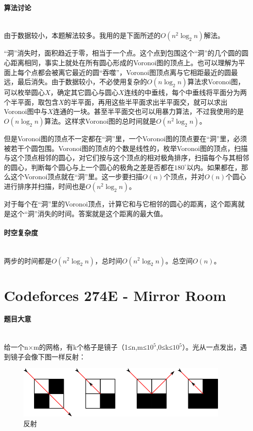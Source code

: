\documentclass[UTF8]{ctexart}
\newcommand{\myparagraph}[1]{\paragraph{#1}\mbox{}\\}
\theoremstyle{nonumberplain}
\begin{document}
		\myparagraph{算法讨论}
		
			由于数据较小，本题解法较多。我用的是下面所述的$O(n^2\log_2n)$解法。
		
			“洞”消失时，面积趋近于零，相当于一个点。这个点到包围这个“洞”的几个圆的圆心距离相同，事实上就处在所有圆心形成的Voronoi图的顶点上。也可以理解为平面上每个点都会被离它最近的圆“吞噬”，Voronoi图顶点离与它相距最近的圆最远，最后消失。由于数据较小，不必使用复杂的$O(n\log_2n)$算法求Voronoi图，可以枚举圆心$X$，确定其它圆心与圆心$X$连线的中垂线，每个中垂线将平面分为两个半平面，取包含$X$的半平面，再用这些半平面求出半平面交，就可以求出Voronoi图中与$X$连通的一块。甚至半平面交也可以用暴力算法，不过我使用的是$O(n\log_2n)$算法。这样求Voronoi图的总时间就是$O(n^2\log_2n)$。
			
			但是Voronoi图的顶点不一定都在“洞”里，一个Voronoi图的顶点要在“洞”里，必须被若干个圆包围。Voronoi图的顶点的个数是线性的，枚举Voronoi图的顶点，扫描与这个顶点相邻的圆心，对它们按与这个顶点的相对极角排序，扫描每个与其相邻的圆心，判断每个圆心与上一个圆心的极角之差是否都在$180^\circ$以内。如果都在，那么这个Voronoi顶点就在“洞”里。这一步要扫描$O(n)$个顶点，并对$O(n)$个圆心进行排序并扫描，时间也是$O(n^2\log_2n)$。
			
			对于每个在“洞”里的Voronoi顶点，计算它和与它相邻的圆心的距离，这个距离就是这个“洞”消失的时间。答案就是这个距离的最大值。
		
		\myparagraph{时空复杂度}
		
			两步的时间都是$O(n^2\log_2n)$，总时间$O(n^2\log_2n)$。总空间$O(n)$。
	
	\section{Codeforces 274E - Mirror Room}
		
		\myparagraph{题目大意}
			
			给一个n×m的网格，有k个格子是镜子（1≤n,m≤$10^5$,0≤k≤$10^5$）。光从一点发出，遇到镜子会像下图一样反射：
			
			\begin{figure}[ht]
				\centering
				\includegraphics[width=\textwidth]{fig274e_1.png}
				\caption{反射}
			\end{figure}
			
\end{document}
